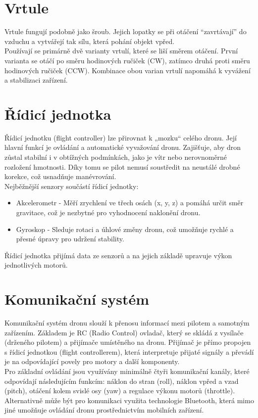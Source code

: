 \documentclass[12pt]{report}
\begin{document}
\section{Vrtule}

Vrtule fungují podobně jako šroub. Jejich lopatky se při otáčení “zavrtávají” do vzduchu a vytvářejí tak sílu, která pohání objekt vpřed.\\
Používají se primárně dvě varianty vrtulí, které se liší směrem otáčení. První varianta se otáčí po směru hodinových ručiček (CW), zatímco druhá proti směru hodinových ručiček (CCW). Kombinace obou varian vrtulí napomáhá k vyvážení a stabilizaci zařízení. \cite{mainbook} \cite{dojo}

\section{Řídicí jednotka}

Řídicí jednotku (flight controller) lze přirovnat k „mozku“ celého dronu. Její hlavní funkcí je ovládání a automatické vyvažování dronu. Zajišťuje, aby dron zůstal stabilní i v obtížných podmínkách, jako je vítr nebo nerovnoměrné rozložení hmotnosti. Díky tomu se pilot nemusí soustředit na neustálé drobné korekce, což usnadňuje manévrování.\\

Nejběžnější senzory součástí řídicí jednotky:
\begin{itemize}
	\item Akcelerometr -  Měří zrychlení ve třech osách (x, y, z) a pomáhá určit směr gravitace, což je nezbytné pro vyhodnocení naklonění dronu.
	\item Gyroskop - Sleduje rotaci a úhlové změny dronu, což umožňuje rychlé a přesné úpravy pro udržení stability.
\end{itemize}

Řídicí jednotka přijímá data ze senzorů a na jejich základě upravuje výkon jednotlivých motorů. \cite{mainbook}

\section{Komunikační systém}
Komunikační systém dronu slouží k přenosu informací mezi pilotem a samotným zařízením. Základem je RC (Radio Control) ovladač, který se skládá z vysílače (drženého pilotem) a přijímače umístěného na dronu. Přijímač je přímo propojen s řídicí jednotkou (flight controllerem), která interpretuje přijaté signály a převádí je na odpovídající povely pro motory a další komponenty.\\
Pro základní ovládání jsou využívány minimálně čtyři komunikační kanály, které odpovídají následujícím funkcím: náklon do stran (roll), náklon vpřed a vzad (pitch), otáčení kolem svislé osy (yaw) a regulace výkonu motorů (throttle). Alternativně může být pro komunikaci využita technologie Bluetooth, která mimo jiné umožňuje ovládání dronu prostřednictvím mobilních zařízení.
\end{document}
